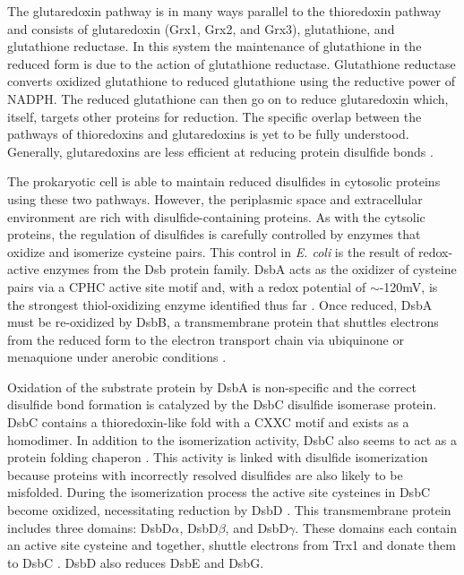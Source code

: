 The glutaredoxin pathway is in many ways parallel to the thioredoxin pathway
and consists of glutaredoxin (Grx1, Grx2, and Grx3), glutathione, and
glutathione reductase.  In this system the maintenance of glutathione in the
reduced form is due to the action of glutathione reductase.  Glutathione
reductase converts oxidized glutathione to reduced glutathione using the
reductive power of NADPH.  The reduced glutathione can then go on to reduce
glutaredoxin which, itself, targets other proteins for reduction.  The specific
overlap between the pathways of thioredoxins and glutaredoxins is yet to be
fully understood.  Generally, glutaredoxins are less efficient at reducing
protein disulfide bonds \cite{47,48,17}. 


The prokaryotic cell is able to maintain reduced disulfides in cytosolic
proteins using these two pathways.  However, the periplasmic space and
extracellular environment are rich with disulfide-containing proteins.  As with
the cytsolic proteins, the regulation of disulfides is carefully controlled by
enzymes that oxidize and isomerize cysteine pairs. This control in \emph{E.
coli} is the result of redox-active enzymes from the Dsb protein family. DsbA
acts as the oxidizer of cysteine pairs via a CPHC
active site motif and, with a redox potential of $\sim$-120mV, is the strongest
thiol-oxidizing enzyme identified thus far \cite{59}. Once reduced, DsbA must be
re-oxidized by DsbB, a transmembrane protein that shuttles
electrons from the reduced form to the electron transport chain via ubiquinone
or menaquione under anerobic conditions \cite{87,88}.

Oxidation of the substrate protein by DsbA is non-specific and the correct
disulfide bond formation is catalyzed by the DsbC disulfide isomerase protein.
DsbC contains a thioredoxin-like fold with a CXXC motif and exists as a
homodimer. In addition to the isomerization activity, DsbC also seems to act as
a protein folding chaperon \cite{67,68}.  This activity is linked with
disulfide isomerization because proteins with incorrectly resolved disulfides
are also likely to be misfolded.  During the isomerization process the active
site cysteines in DsbC become oxidized, necessitating reduction by DsbD
\cite{54,78}.  This transmembrane protein includes three domains: DsbD$\alpha$,
DsbD$\beta$, and DsbD$\gamma$.  These domains each contain an active site
cysteine and together, shuttle electrons from Trx1 and donate them to DsbC
\cite{64,79}. DsbD also reduces DsbE and DsbG.

